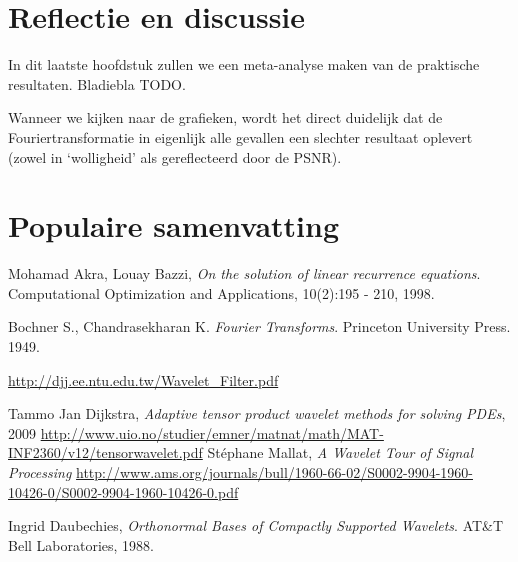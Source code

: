 \documentclass[11pt]{report}
\theoremstyle{plain}
\theoremstyle{remark}
\begin{document}
\chapter{Reflectie en discussie}
In dit laatste hoofdstuk zullen we een meta-analyse maken van de praktische resultaten. Bladiebla TODO.

Wanneer we kijken naar de grafieken, wordt het direct duidelijk dat de Fouriertransformatie in eigenlijk alle gevallen een slechter resultaat oplevert (zowel in `wolligheid' als gereflecteerd door de PSNR).
\chapter{Populaire samenvatting}

\begin{thebibliography}{11}

  Mohamad Akra, Louay Bazzi,
  \emph{On the solution of linear recurrence equations}.
  Computational Optimization and Applications, 
  10(2):195 - 210,
  1998.

  Bochner S., Chandrasekharan K. 
  \emph{Fourier Transforms}. 
  Princeton University Press.
  1949.

	\url{http://djj.ee.ntu.edu.tw/Wavelet_Filter.pdf}

Tammo Jan Dijkstra,
\emph{Adaptive tensor product wavelet methods for solving PDEs}, 2009
\url{http://www.uio.no/studier/emner/matnat/math/MAT-INF2360/v12/tensorwavelet.pdf}
St\'ephane Mallat,
\emph{A Wavelet Tour of Signal Processing}
\url{http://www.ams.org/journals/bull/1960-66-02/S0002-9904-1960-10426-0/S0002-9904-1960-10426-0.pdf}

Ingrid Daubechies, \emph{Orthonormal Bases of Compactly Supported Wavelets}.
AT\&T Bell Laboratories, 1988.

\end{thebibliography}
\end{document}
